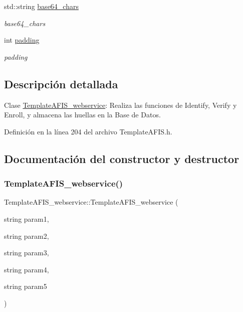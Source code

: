 \begin{DoxyCompactItemize}
std\+::string \hyperlink{classTemplateAFIS__webservice_a09c632296df4dd488ab09fee6e26f4eb}{base64\+\_\+chars}
\begin{DoxyCompactList}\small\item\em base64\+\_\+chars \end{DoxyCompactList}\item 
int \hyperlink{classTemplateAFIS__webservice_a5be66b367a1276c21ffc3450c1f69643}{padding}
\begin{DoxyCompactList}\small\item\em padding \end{DoxyCompactList}\end{DoxyCompactItemize}


\subsection{Descripción detallada}
Clase \hyperlink{classTemplateAFIS__webservice}{Template\+A\+F\+I\+S\+\_\+webservice}\+: Realiza las funciones de Identify, Verify y Enroll, y almacena las huellas en la Base de Datos. 

Definición en la línea 204 del archivo Template\+A\+F\+I\+S.\+h.



\subsection{Documentación del constructor y destructor}
\hypertarget{classTemplateAFIS__webservice_ace8ba45d6e489c7d34bfbfb55970724f}{}\label{classTemplateAFIS__webservice_ace8ba45d6e489c7d34bfbfb55970724f} 
\subsubsection{\texorpdfstring{Template\+A\+F\+I\+S\+\_\+webservice()}{TemplateAFIS\_webservice()}}
{\footnotesize\ttfamily Template\+A\+F\+I\+S\+\_\+webservice\+::\+Template\+A\+F\+I\+S\+\_\+webservice (\begin{DoxyParamCaption}\item[{string}]{param1,  }\item[{string}]{param2,  }\item[{string}]{param3,  }\item[{string}]{param4,  }\item[{string}]{param5 }\end{DoxyParamCaption})}



